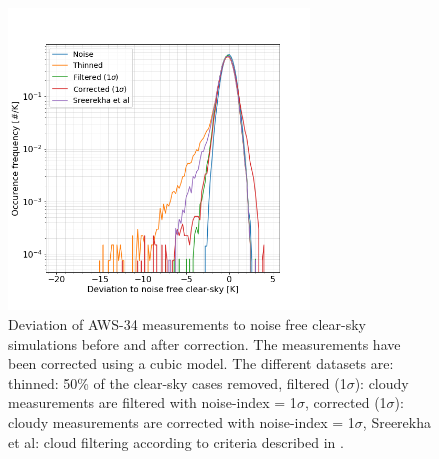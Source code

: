 \documentclass[12pt]{article}
\begin{document}
\begin{figure}[!p]
	\centering
	\includegraphics[height=80mm]{PDF_corrected_AWS-34_AWS-42_thinned}
	\caption{Deviation of AWS-34 measurements to noise free clear-sky
      simulations before and after correction. The measurements have been
      corrected using a cubic model. The different datasets are: thinned: 50\%
      of the clear-sky cases removed, filtered (1$\sigma$): cloudy measurements
      are filtered with noise-index = 1$\sigma$, corrected (1$\sigma$): cloudy
      measurements are corrected with noise-index = 1$\sigma$, Sreerekha et al:
      cloud filtering according to criteria described in
      \cite{rekha2012potential}.}
	\label{fig:correction:c34-42:thinned}
\end{figure}
%
\end{document}
